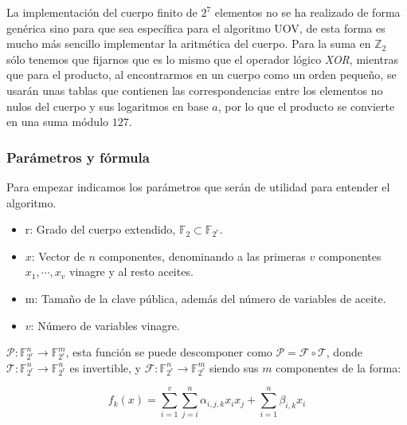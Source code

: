 La implementación del cuerpo finito de $2^7$ elementos no se ha realizado de forma genérica sino para que sea específica para el algoritmo UOV, de esta forma es mucho más sencillo implementar la aritmética del cuerpo. Para la suma en $\mathds{Z}_2$ sólo tenemos que fijarnos que es lo mismo que el operador lógico \textit{XOR}, mientras que para el producto, al encontrarmos en un cuerpo como un orden pequeño, se usarán unas tablas que contienen las correspondencias entre los elementos no nulos del cuerpo y sus logaritmos en base $a$, por lo que el producto se convierte en una suma módulo $127$.




\subsubsection{Parámetros y fórmula}
Para empezar indicamos los parámetros que serán de utilidad para entender el algoritmo.
\begin{itemize}
	\item r: Grado del cuerpo extendido, $\mathds{F}_2 \subset \mathds{F}_{2^r}$. %
	\item $x$: Vector de $n$ componentes, denominando a las primeras $v$ componentes  $x_1, \dotsb, x_v$ vinagre y al resto aceites.
	
	\item m: Tamaño de la clave pública, además del número de variables de aceite.
	\item $v$: Número de variables vinagre.
\end{itemize}

$\mathcal{P}: \mathds{F}_{2^r}^n \rightarrow \mathds{F}_{2^r}^m$, esta función se puede descomponer como $\mathcal{P} = \mathcal{F} \circ \mathcal{T}$, donde $\mathcal{T}: \mathds{F}_{2^r}^n \rightarrow \mathds{F}_{2^r}^n$ es invertible, y $\mathcal{F}: \mathds{F}_{2^r}^n \rightarrow \mathds{F}_{2^r}^m$ siendo sus $m$ componentes de la forma:

\begin{equation}\label{eq:fun}
f_k(x) = \sum_{i=1}^v \sum_{j=i}^n \alpha_{i,j,k} x_i x_j + \sum_{i=1}^n \beta_{i,k} x_i
\end{equation}

